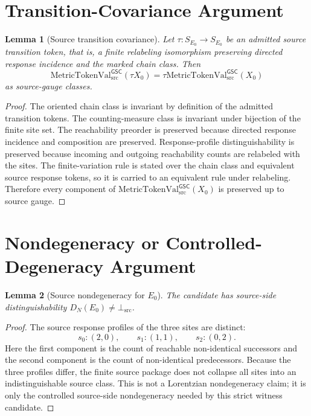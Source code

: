 \documentclass[11pt]{article}
\newcommand{\MetricTokenVal}{\mathrm{MetricTokenVal}_{\mathrm{src}}^{\mathsf{GSC}}}
\newcommand{\BottomSrc}{\bot_{\mathrm{src}}}
\newcommand{\Ezero}{E_{0}}
\newtheorem{lemma}{Lemma}
\begin{document}
\section{Transition-Covariance Argument}\label{transition-covariance-argument}

\begin{lemma}[Source transition covariance]
Let \(\tau:S_{\Ezero}\to S_{\Ezero}\) be an admitted source transition token,
that is, a finite relabeling isomorphism preserving directed response
incidence and the marked chain class. Then
\[
  \MetricTokenVal(\tau X_0)=\tau\MetricTokenVal(X_0)
\]
as source-gauge classes.
\end{lemma}

\begin{proof}
The oriented chain class is invariant by definition of the admitted
transition tokens. The counting-measure class is invariant under bijection of
the finite site set. The reachability preorder is preserved because directed
response incidence and composition are preserved. Response-profile
distinguishability is preserved because incoming and outgoing reachability
counts are relabeled with the sites. The finite-variation rule is stated over
the chain class and equivalent source response tokens, so it is carried to an
equivalent rule under relabeling. Therefore every component of
\(\MetricTokenVal(X_0)\) is preserved up to source gauge.
\end{proof}

\section{Nondegeneracy or Controlled-Degeneracy Argument}\label{nondegeneracy-or-controlled-degeneracy-argument}

\begin{lemma}[Source nondegeneracy for \(\Ezero\)]
The candidate has source-side distinguishability \(D_N(\Ezero)\neq\BottomSrc\).
\end{lemma}

\begin{proof}
The source response profiles of the three sites are distinct:
\[
  s_0:(2,0),\qquad s_1:(1,1),\qquad s_2:(0,2).
\]
Here the first component is the count of reachable non-identical successors
and the second component is the count of non-identical predecessors. Because
the three profiles differ, the finite source package does not collapse all
sites into an indistinguishable source class. This is not a Lorentzian
nondegeneracy claim; it is only the controlled source-side nondegeneracy
needed by this strict witness candidate.
\end{proof}
\end{document}
